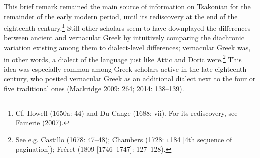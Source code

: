 \begin{styleStandard}
This brief remark remained the main source of information on Tsakonian for the remainder of the early modern period, until its rediscovery at the end of the eighteenth century.\footnote{ Cf. Howell (1650a: 44) and Du Cange (1688: vii). For its rediscovery, see Famerie (2007).} Still other scholars seem to have downplayed the differences between ancient and vernacular Greek by intuitively comparing the diachronic variation existing among them to dialect-level differences; vernacular Greek was, in other words, a dialect of the language just like Attic and Doric were.\footnote{ See e.g. Castillo (1678: 47–48); Chambers (1728: \textsc{i.}184 [4th sequence of pagination]); Fréret (1809 [1746–1747]: 127–128).} This idea was especially common among Greek scholars active in the late eighteenth century, who posited vernacular Greek as an additional dialect next to the four or five traditional ones (Mackridge 2009: 264; 2014: 138–139).
\end{styleStandard}

